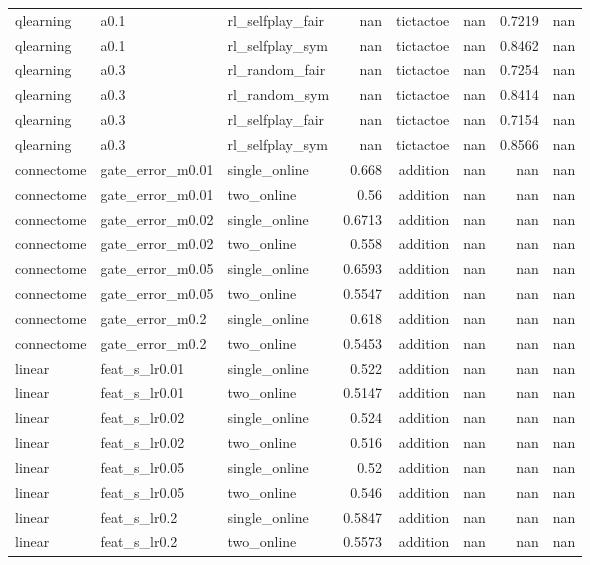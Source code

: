 \begin{table}[t]
\begin{tabular}{lllrrrrr}
qlearning & a0.1 & rl\_selfplay\_fair & nan & tictactoe & nan & 0.7219 & nan \\
qlearning & a0.1 & rl\_selfplay\_sym & nan & tictactoe & nan & 0.8462 & nan \\
qlearning & a0.3 & rl\_random\_fair & nan & tictactoe & nan & 0.7254 & nan \\
qlearning & a0.3 & rl\_random\_sym & nan & tictactoe & nan & 0.8414 & nan \\
qlearning & a0.3 & rl\_selfplay\_fair & nan & tictactoe & nan & 0.7154 & nan \\
qlearning & a0.3 & rl\_selfplay\_sym & nan & tictactoe & nan & 0.8566 & nan \\
connectome & gate\_error\_m0.01 & single\_online & 0.668 & addition & nan & nan & nan \\
connectome & gate\_error\_m0.01 & two\_online & 0.56 & addition & nan & nan & nan \\
connectome & gate\_error\_m0.02 & single\_online & 0.6713 & addition & nan & nan & nan \\
connectome & gate\_error\_m0.02 & two\_online & 0.558 & addition & nan & nan & nan \\
connectome & gate\_error\_m0.05 & single\_online & 0.6593 & addition & nan & nan & nan \\
connectome & gate\_error\_m0.05 & two\_online & 0.5547 & addition & nan & nan & nan \\
connectome & gate\_error\_m0.2 & single\_online & 0.618 & addition & nan & nan & nan \\
connectome & gate\_error\_m0.2 & two\_online & 0.5453 & addition & nan & nan & nan \\
linear & feat\_s\_lr0.01 & single\_online & 0.522 & addition & nan & nan & nan \\
linear & feat\_s\_lr0.01 & two\_online & 0.5147 & addition & nan & nan & nan \\
linear & feat\_s\_lr0.02 & single\_online & 0.524 & addition & nan & nan & nan \\
linear & feat\_s\_lr0.02 & two\_online & 0.516 & addition & nan & nan & nan \\
linear & feat\_s\_lr0.05 & single\_online & 0.52 & addition & nan & nan & nan \\
linear & feat\_s\_lr0.05 & two\_online & 0.546 & addition & nan & nan & nan \\
linear & feat\_s\_lr0.2 & single\_online & 0.5847 & addition & nan & nan & nan \\
linear & feat\_s\_lr0.2 & two\_online & 0.5573 & addition & nan & nan & nan \\

\end{tabular}
\end{table}
